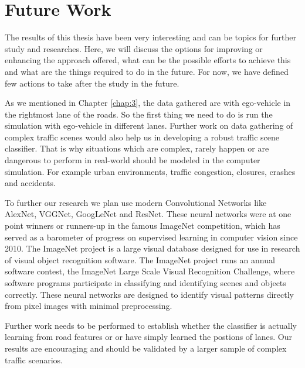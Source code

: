 \section{Future Work}
The results of this thesis have been very interesting and can be topics for further study and researches. Here, we will discuss the options for improving or enhancing the approach offered, what can be the possible efforts to achieve this and what are the things required to do in the future. For now, we have defined few actions to take after the study in the future.
\par
As we mentioned in Chapter \ref{chap:3}, the data gathered are with ego-vehicle in the rightmost lane of the roads. So the first thing we need to do is run the simulation with ego-vehicle in different lanes. Further work on data gathering of complex traffic scenes would also help us in developing a robust traffic scene classifier. That is why situations which are complex, rarely happen or are dangerous to perform in real-world should be modeled in the computer simulation. For example urban environments, traffic congestion, closures, crashes and accidents.
\par
To further our research we plan use modern Convolutional Networks like AlexNet, VGGNet, GoogLeNet and ResNet. These neural networks were at one point winners or runners-up in the famous ImageNet competition, which has served as a barometer of progress on supervised learning in computer vision since 2010. The ImageNet project is a large visual database designed for use in research of visual object recognition software. The ImageNet project runs an annual software contest, the ImageNet Large Scale Visual Recognition Challenge, where software programs participate in classifying and identifying scenes and objects correctly. These neural networks are designed to identify visual patterns directly from pixel images with minimal preprocessing.

\par
Further work needs to be performed to establish whether the classifier is actually learning from road features or or have simply learned the postions of lanes. Our results are encouraging and should be validated by a larger sample of complex traffic scenarios.

